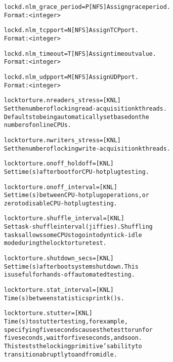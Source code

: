 \documentclass[a4paper,8pt,english]{sphinxmanual}
\begin{document}
\begin{alltt}
        lockd.nlm\_grace\_period=P  {[}NFS{]} Assign grace period.
                        Format: \textless{}integer\textgreater{}

        lockd.nlm\_tcpport=N     {[}NFS{]} Assign TCP port.
                        Format: \textless{}integer\textgreater{}

        lockd.nlm\_timeout=T     {[}NFS{]} Assign timeout value.
                        Format: \textless{}integer\textgreater{}

        lockd.nlm\_udpport=M     {[}NFS{]} Assign UDP port.
                        Format: \textless{}integer\textgreater{}

        locktorture.nreaders\_stress= {[}KNL{]}
                        Set the number of locking read-acquisition kthreads.
                        Defaults to being automatically set based on the
                        number of online CPUs.

        locktorture.nwriters\_stress= {[}KNL{]}
                        Set the number of locking write-acquisition kthreads.

        locktorture.onoff\_holdoff= {[}KNL{]}
                        Set time (s) after boot for CPU-hotplug testing.

        locktorture.onoff\_interval= {[}KNL{]}
                        Set time (s) between CPU-hotplug operations, or
                        zero to disable CPU-hotplug testing.

        locktorture.shuffle\_interval= {[}KNL{]}
                        Set task-shuffle interval (jiffies).  Shuffling
                        tasks allows some CPUs to go into dyntick-idle
                        mode during the locktorture test.

        locktorture.shutdown\_secs= {[}KNL{]}
                        Set time (s) after boot system shutdown.  This
                        is useful for hands-off automated testing.

        locktorture.stat\_interval= {[}KNL{]}
                        Time (s) between statistics printk()s.

        locktorture.stutter= {[}KNL{]}
                        Time (s) to stutter testing, for example,
                        specifying five seconds causes the test to run for
                        five seconds, wait for five seconds, and so on.
                        This tests the locking primitive's ability to
                        transition abruptly to and from idle.


\end{alltt}
\end{document}
